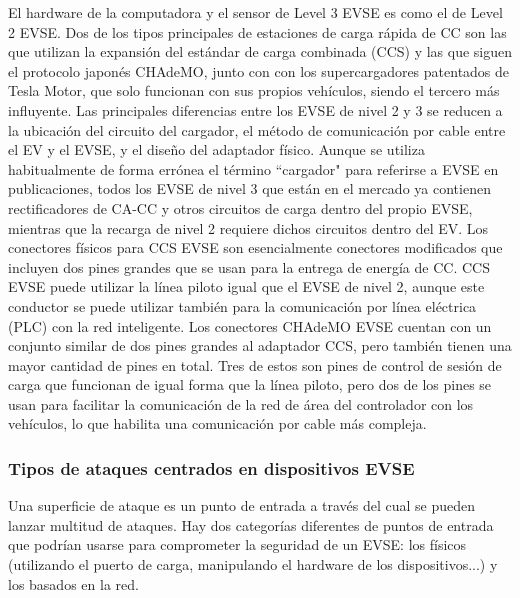 \documentclass[12pt,a4paper,onecolumn,oneside]{report}
\newcounter{subsubsubsection}[subsubsection]
\begin{document}
El hardware de la computadora y el sensor de Level 3 EVSE es como el de Level 2 EVSE. Dos de los tipos principales de estaciones de carga rápida de CC son las que utilizan la expansión del estándar de carga combinada (CCS) y las que siguen el protocolo japonés CHAdeMO, junto con con los supercargadores patentados de Tesla Motor, que solo funcionan con sus propios vehículos, siendo el tercero más influyente. Las principales diferencias entre los EVSE de nivel 2 y 3 se reducen a la ubicación del circuito del cargador, el método de comunicación por cable entre el EV y el EVSE, y el diseño del adaptador físico. Aunque se utiliza habitualmente de forma errónea el término ``cargador" para referirse a EVSE en publicaciones, todos los EVSE de nivel 3 que están en el mercado ya contienen rectificadores de CA-CC y otros circuitos de carga dentro del propio EVSE, mientras que la recarga de nivel 2 requiere dichos circuitos dentro del EV. Los conectores físicos para CCS EVSE son esencialmente conectores modificados que incluyen dos pines grandes que se usan para la entrega de energía de CC. CCS EVSE puede utilizar la línea piloto igual que el EVSE de nivel 2, aunque este conductor se puede utilizar también para la comunicación por línea eléctrica (PLC) con la red inteligente. Los conectores CHAdeMO EVSE cuentan con un conjunto similar de dos pines grandes al adaptador CCS, pero también tienen una mayor cantidad de pines en total. Tres de estos son pines de control de sesión de carga que funcionan de igual forma que la línea piloto, pero dos de los pines se usan para facilitar la comunicación de la red de área del controlador con los vehículos, lo que habilita una comunicación por cable más compleja.

\subsubsection{Tipos de ataques centrados en dispositivos EVSE}
\label{Tipos de ataques centrados en dispositivos EVSE}

Una superficie de ataque es un punto de entrada a través del cual se pueden lanzar multitud de ataques. Hay dos categorías diferentes de puntos de entrada que podrían usarse para comprometer la seguridad de un EVSE: los físicos (utilizando el puerto de carga, manipulando el hardware de los dispositivos...) y los basados en la red.


\end{document}
